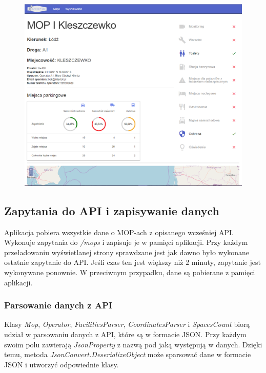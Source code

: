 \begin{figure}[!htb]
\centering
\includegraphics[width=\textwidth]{images/mopsik_www/details1.png}
\label{mopsik_www_details}
\end{figure}

\subsection{Zapytania do API i zapisywanie danych}
Aplikacja pobiera wszystkie dane o MOP-ach z opisanego wcześniej API. Wykonuje zapytania do \textit{/mops} i zapisuje je w pamięci aplikacji. Przy każdym przeładowaniu wyświetlanej strony sprawdzane jest jak dawno było wykonane ostatnie zapytanie do API. Jeśli czas ten jest większy niż 2 minuty, zapytanie jest wykonywane ponownie. W przeciwnym przypadku, dane są pobierane z pamięci aplikacji.

\subsubsection{Parsowanie danych z API}
Klasy \textit{Mop}, \textit{Operator}, \textit{FacilitiesParser}, \textit{CoordinatesParser} i \textit{SpacesCount} biorą udział w parsowaniu danych z API, które są w formacie JSON. Przy każdym swoim polu zawierają \textit{JsonProperty} z nazwą pod jaką występują w danych. Dzięki temu, metoda \textit{JsonConvert.DeserializeObject} może sparsować dane w formacie JSON i utworzyć odpowiednie klasy.

